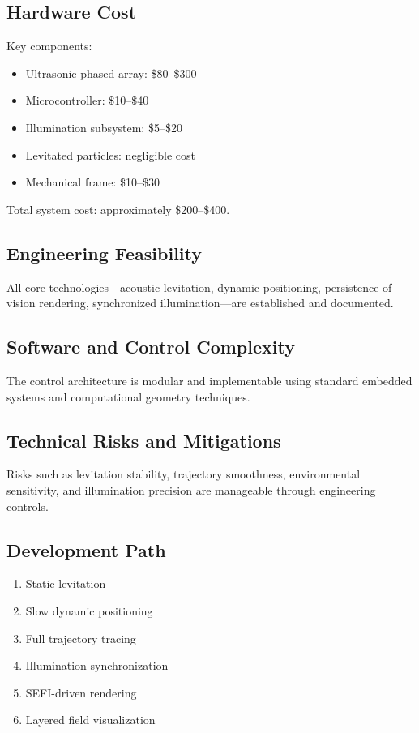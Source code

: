 \documentclass[10pt,twocolumn]{article}
\begin{document}
\subsection{Hardware Cost}
Key components:
\begin{itemize}
    \item Ultrasonic phased array: \$80--\$300
    \item Microcontroller: \$10--\$40
    \item Illumination subsystem: \$5--\$20
    \item Levitated particles: negligible cost
    \item Mechanical frame: \$10--\$30
\end{itemize}
Total system cost: approximately \$200--\$400.

\subsection{Engineering Feasibility}
All core technologies—acoustic levitation, dynamic positioning, persistence-of-vision rendering, synchronized illumination—are established and documented.

\subsection{Software and Control Complexity}
The control architecture is modular and implementable using standard embedded systems and computational geometry techniques.

\subsection{Technical Risks and Mitigations}
Risks such as levitation stability, trajectory smoothness, environmental sensitivity, and illumination precision are manageable through engineering controls.

\subsection{Development Path}
\begin{enumerate}
    \item Static levitation
    \item Slow dynamic positioning
    \item Full trajectory tracing
    \item Illumination synchronization
    \item SEFI-driven rendering
    \item Layered field visualization
\end{enumerate}
\end{document}
